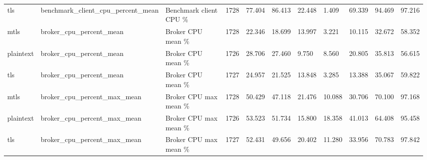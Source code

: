 \begin{tabular}{lllllllllll}
tls & benchmark\_client\_cpu\_percent\_mean & Benchmark client CPU \% & 1728 & 77.404 & 86.413 & 22.448 & 1.409 & 69.339 & 94.469 & 97.216 \\
mtls & broker\_cpu\_percent\_mean & Broker CPU mean \% & 1728 & 22.346 & 18.699 & 13.997 & 3.221 & 10.115 & 32.672 & 58.352 \\
plaintext & broker\_cpu\_percent\_mean & Broker CPU mean \% & 1726 & 28.706 & 27.460 & 9.750 & 8.560 & 20.805 & 35.813 & 56.615 \\
tls & broker\_cpu\_percent\_mean & Broker CPU mean \% & 1727 & 24.957 & 21.525 & 13.848 & 3.285 & 13.388 & 35.067 & 59.822 \\
mtls & broker\_cpu\_percent\_max\_mean & Broker CPU max mean \% & 1728 & 50.429 & 47.118 & 21.476 & 10.088 & 30.706 & 70.100 & 97.168 \\
plaintext & broker\_cpu\_percent\_max\_mean & Broker CPU max mean \% & 1726 & 53.523 & 51.734 & 15.800 & 18.358 & 41.013 & 64.408 & 95.458 \\
tls & broker\_cpu\_percent\_max\_mean & Broker CPU max mean \% & 1727 & 52.431 & 49.656 & 20.402 & 11.280 & 33.956 & 70.783 & 97.842 \\
\hline
\end{tabular}
